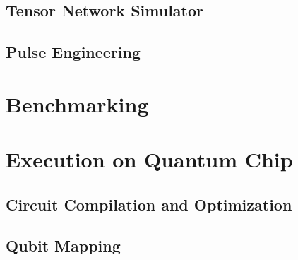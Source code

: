 \documentclass[pra,twocolumn,superscriptaddress,floatfix,nofootinbib,amsmath,amssymb]{revtex4-1}
\numberwithin{equation}{section}
\numberwithin{figure}{section}
\numberwithin{table}{section}
\begin{document}
\subsection{Tensor Network Simulator}


\subsection{Pulse Engineering}



\section{Benchmarking}
\label{sec:benchmark}



\section{Execution on Quantum Chip}
\label{sec:chip}
\subsection{Circuit Compilation and Optimization}


\subsection{Qubit Mapping}


% 

% 
\end{document}
